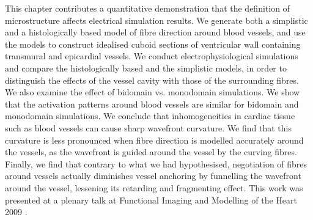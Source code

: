 
This chapter contributes a quantitative demonstration that the definition of microstructure affects electrical simulation results. We generate both a simplistic and a histologically based model of fibre direction around blood vessels, and use the models to construct idealised cuboid sections of ventricular wall containing transmural and epicardial vessels. We conduct electrophysiological simulations and compare the histologically based and the simplistic models, in order to distinguish the effects of the vessel cavity with those of the surrounding fibres. We also examine the effect of bidomain vs. monodomain simulations. We show that the activation patterns around blood vessels are similar for bidomain and monodomain simulations. We conclude that inhomogeneities in cardiac tissue such as blood vessels can cause sharp wavefront curvature. We find that this curvature is less pronounced when fibre direction is modelled accurately around the vessels, as the wavefront is guided around the vessel by the curving fibres. Finally, we find that contrary to what we had hypothesised, negotiation of fibres around vessels actually diminishes vessel anchoring by funnelling the wavefront around the vessel, lessening its retarding and fragmenting effect. This work was presented at a plenary talk at Functional Imaging and Modelling of the Heart 2009 \cite{Gibb2009}.